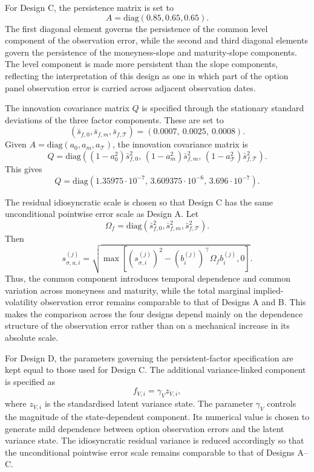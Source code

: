\documentclass[11pt,a4paper,notitlepage]{article}
\numberwithin{equation}{section}
\begin{document}
For Design C, the persistence matrix is set to
\[
A=\mathrm{diag}(0.85,0.65,0.65).
\]
The first diagonal element governs the persistence of the common level component of the observation error, while the second and third diagonal elements govern the persistence of the moneyness-slope and maturity-slope components. The level component is made more persistent than the slope components, reflecting the interpretation of this design as one in which part of the option panel observation error is carried across adjacent observation dates.

The innovation covariance matrix $Q$ is specified through the stationary standard deviations of the three factor components. These are set to
\[
(\bar s_{f,0},\bar s_{f,m},\bar s_{f,\mathcal T})
=
(0.0007,\ 0.0025,\ 0.0008).
\]
Given $A=\mathrm{diag}(a_0,a_m,a_\mathcal T)$, the innovation covariance matrix is
\[
Q
=
\mathrm{diag}
\left(
(1-a_0^2)\bar s_{f,0}^2,\,
(1-a_m^2)\bar s_{f,m}^2,\,
(1-a_\mathcal T^2)\bar s_{f,\mathcal T}^2
\right).
\]
This gives
\[
Q
=
\mathrm{diag}
\left(
1.35975\cdot10^{-7},\,
3.609375\cdot10^{-6},\,
3.696\cdot10^{-7}
\right).
\]

The residual idiosyncratic scale is chosen so that Design C has the same unconditional pointwise error scale as Design A. Let
\[
\Omega_f
=
\mathrm{diag}
\left(
\bar s_{f,0}^2,\bar s_{f,m}^2,\bar s_{f,\mathcal T}^2
\right).
\]
Then
\[
s_{\sigma,u,i}^{(j)}
=
\sqrt{
\max\left[
\left(s_{\sigma,i}^{(j)}\right)^2
-
\left(b_i^{(j)}\right)^\top \Omega_f b_i^{(j)},
0
\right]
}.
\]
Thus, the common component introduces temporal dependence and common variation across moneyness and maturity, while the total marginal implied-volatility observation error remains comparable to that of Designs A and B. This makes the comparison across the four designs depend mainly on the dependence structure of the observation error rather than on a mechanical increase in its absolute scale.

For Design D, the parameters governing the persistent-factor specification are kept equal to those used for Design C. The additional variance-linked component is specified as
\[
f_{V,i}=\gamma_V z_{V,i},
\]
where $z_{V,i}$ is the standardised latent variance state. The parameter $\gamma_V$ controls the magnitude of the state-dependent component. Its numerical value is chosen to generate mild dependence between option observation errors and the latent variance state. The idiosyncratic residual variance is reduced accordingly so that the unconditional pointwise error scale remains comparable to that of Designs A--C.
\end{document}
